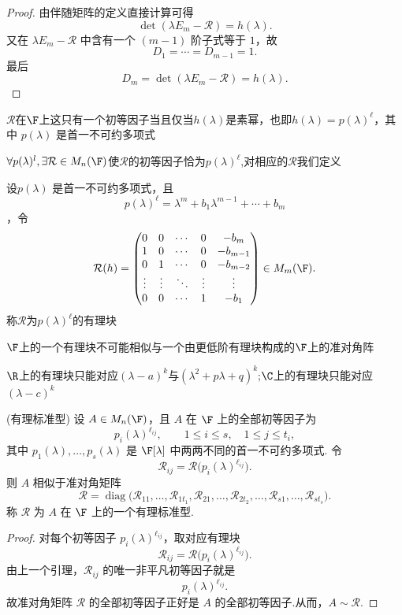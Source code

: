 \begin{proof}
	由伴随矩阵的定义直接计算可得
	\[
	\det(\lambda E_m-\mathcal{R})=h(\lambda).
	\]
	又在 $\lambda E_m-\mathcal{R}$ 中含有一个 $(m-1)$ 阶子式等于 $1$，故
	\[
	D_1=\cdots=D_{m-1}=1.
	\]
	最后
	\[
	D_m=\det(\lambda E_m-\mathcal{R})=h(\lambda).
	\]
\end{proof}

$\mathcal{R}$在$\F$上这只有一个初等因子当且仅当$h(\lambda)$是素幂，也即$h(\lambda)=p(\lambda)^\ell$，其中 $p(\lambda)$ 是首一不可约多项式

$\forall p(\lambda)^l,\exists \mathcal{R}\in M_{n}(\F)$使$\mathcal{R}$的初等因子恰为$p(\lambda)^\ell$,对相应的$\mathcal{R}$我们定义
\begin{definition}
	 设$p(\lambda)$ 是首一不可约多项式，且\[p(\lambda)^\ell = \lambda^m + b_1 \lambda^{m-1} + \cdots + b_m\]
	 ，令\[
	 \mathcal{R}(h)=
	 \begin{pmatrix}
	 	0&0&\cdots&0&-b_m\\
	 	1&0&\cdots&0&-b_{m-1}\\
	 	0&1&\cdots&0&-b_{m-2}\\
	 	\vdots&\vdots&\ddots&\vdots&\vdots\\
	 	0&0&\cdots&1&-b_1
	 \end{pmatrix}\in M_m(\F).
	 \]
	 称$\mathcal{R}$为$p(\lambda)^\ell$的有理块
\end{definition}
$\F$上的一个有理块不可能相似与一个由更低阶有理块构成的$\F$上的准对角阵

$\R$上的有理块只能对应$(\lambda -a)^k$与$(\lambda^2 + p\lambda +q)^k$;$\C$上的有理块只能对应$(\lambda -c)^k$
\begin{theorem}(有理标准型)
	设 $A\in M_n(\F)$，且 $A$ 在 $\F$ 上的全部初等因子为
	\[
	p_i(\lambda)^{\ell_{ij}},
	\qquad
	1\leq i\leq s,\quad 1\leq j\leq t_i,
	\]
	其中 $p_1(\lambda),\ldots,p_s(\lambda)$ 是 $\F[\lambda]$ 中两两不同的首一不可约多项式.
	令
	\[
	\mathcal{R}_{ij}=\mathcal{R}\bigl(p_i(\lambda)^{\ell_{ij}}\bigr).
	\]
	则 $A$ 相似于准对角矩阵
	\[
	\mathcal{R}=
	\operatorname{diag}
	\bigl(
	\mathcal{R}_{11},\ldots,\mathcal{R}_{1t_1},
	\mathcal{R}_{21},\ldots,\mathcal{R}_{2t_2},
	\ldots,
	\mathcal{R}_{s1},\ldots,\mathcal{R}_{st_s}
	\bigr).
	\]
	称 $\mathcal{R}$ 为 $A$ 在 $\F$ 上的一个有理标准型.
\end{theorem}

\begin{proof}
	对每个初等因子 $p_i(\lambda)^{\ell_{ij}}$，取对应有理块
	\[
	\mathcal{R}_{ij}=\mathcal{R}\bigl(p_i(\lambda)^{\ell_{ij}}\bigr).
	\]
	由上一个引理，$\mathcal{R}_{ij}$ 的唯一非平凡初等因子就是
	\[
	p_i(\lambda)^{\ell_{ij}}.
	\]
	故准对角矩阵 $\mathcal{R}$ 的全部初等因子正好是 $A$ 的全部初等因子.从而，$A\sim \mathcal{R}$.
\end{proof}

